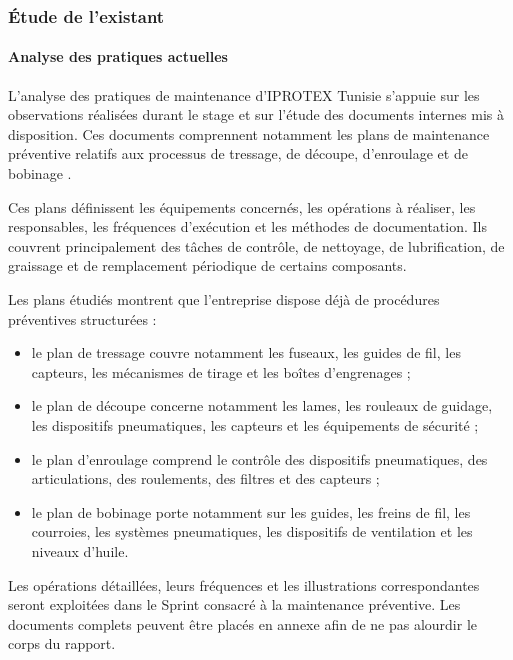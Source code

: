 \subsubsection{Étude de l’existant}

\paragraph{Analyse des pratiques actuelles}

L’analyse des pratiques de maintenance d’IPROTEX Tunisie s’appuie sur les observations réalisées durant le stage et sur l’étude des documents internes mis à disposition. Ces documents comprennent notamment les plans de maintenance préventive relatifs aux processus de tressage, de découpe, d’enroulage et de bobinage \cite{braiding_maintenance,cutting_maintenance,rolling_maintenance,winding_maintenance}.

Ces plans définissent les équipements concernés, les opérations à réaliser, les responsables, les fréquences d’exécution et les méthodes de documentation. Ils couvrent principalement des tâches de contrôle, de nettoyage, de lubrification, de graissage et de remplacement périodique de certains composants.

Les plans étudiés montrent que l’entreprise dispose déjà de procédures préventives structurées :

\begin{itemize}
    \item le plan de tressage couvre notamment les fuseaux, les guides de fil, les capteurs, les mécanismes de tirage et les boîtes d’engrenages ;
    \item le plan de découpe concerne notamment les lames, les rouleaux de guidage, les dispositifs pneumatiques, les capteurs et les équipements de sécurité ;
    \item le plan d’enroulage comprend le contrôle des dispositifs pneumatiques, des articulations, des roulements, des filtres et des capteurs ;
    \item le plan de bobinage porte notamment sur les guides, les freins de fil, les courroies, les systèmes pneumatiques, les dispositifs de ventilation et les niveaux d’huile.
\end{itemize}

Les opérations détaillées, leurs fréquences et les illustrations correspondantes seront exploitées dans le Sprint consacré à la maintenance préventive. Les documents complets peuvent être placés en annexe afin de ne pas alourdir le corps du rapport.

